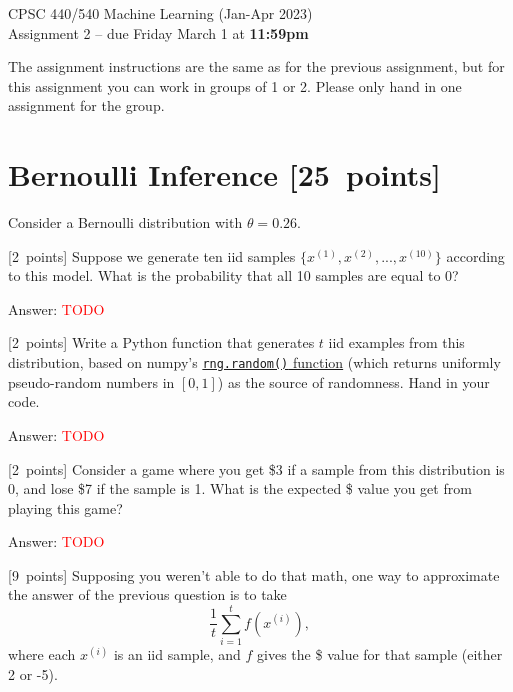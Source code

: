 \documentclass{article}
\newcommand{\ask}[1]{\textcolor{question}{#1}}
\newenvironment{answer}{\par\begingroup\color{answer}Answer: }{\endgroup}
\newcommand{\red}[1]{\textcolor{red}{#1}}
\newcommand{\pts}[1]{\textcolor{points}{[#1~points]}}
\newcommand{\TODO}{\red{TODO}}
\newcommand{\toth}[1]{^{(#1)}}
\newcommand{\ith}{\toth{i}}
\begin{document}
\begin{center}
\Large
CPSC 440/540 Machine Learning (Jan-Apr 2023)\\
Assignment 2 --
due Friday March 1 at \textbf{11:59pm}
\end{center}


The assignment instructions are the same as for the previous assignment, but for this assignment you can work in groups of 1 or 2. Please only hand in one assignment for the group.


\section{Bernoulli Inference \pts{25}}

Consider a Bernoulli distribution with $\theta = 0.26$.
\begin{qlist}

\item \pts{2}
    Suppose we generate ten iid samples $\{x\toth{1},x\toth{2},...,x\toth{10}\}$ according to this model.
    \ask{What is the probability that all 10 samples are equal to 0?}

\begin{answer}\TODO\end{answer}



\item \pts{2}
    Write a Python function that generates $t$ iid examples from this distribution,
    based on numpy's \href{https://numpy.org/doc/stable/reference/random/generated/numpy.random.Generator.random.html#numpy.random.Generator.random}{\texttt{rng.random()} function} (which returns uniformly pseudo-random numbers in $[0, 1]$) as the source of randomness.
    \ask{Hand in your code.}
\begin{answer}\TODO\end{answer}


\item \pts{2}
    Consider a game where you get \$3 if a sample from this distribution is 0, and lose \$7 if the sample is 1.
    \ask{What is the expected \$ value you get from playing this game?}
\begin{answer}\TODO\end{answer}

\item \pts{9}
    Supposing you weren't able to do that math, one way to approximate the answer of the previous question is to take
    \[ \frac 1 t \sum_{i=1}^t f(x\ith), \]
    where each $x\ith$ is an iid sample, and $f$ gives the \$ value for that sample (either 2 or -5).


\end{qlist}
\end{document}
